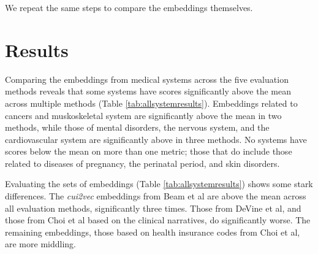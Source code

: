 \documentclass[10pt]{article}
\begin{document}
We repeat the same steps to compare the embeddings themselves. 






\section{Results}

Comparing the embeddings from medical systems across the five evaluation methods reveals that some systems have scores significantly above the mean across multiple methods (Table \ref{tab:allsystemresults}). Embeddings related to cancers and muskoskeletal system are significantly above the mean in two methods, while those of mental disorders, the nervous system, and the cardiovascular system are significantly above in three methods. No systems have scores below the mean on more than one metric; those that do include those related to diseases of pregnancy, the perinatal period, and skin disorders. 

 Evaluating the sets of embeddings (Table \ref{tab:allsystemresults}) shows some stark differences. The \emph{cui2vec} embeddings from Beam et al are above the mean across all evaluation methods, significantly three times. Those from DeVine et al, and those from Choi et al based on the clinical narratives, do significantly worse. The remaining embeddings, those based on health insurance codes from Choi et al, are more middling. 
\end{document}
